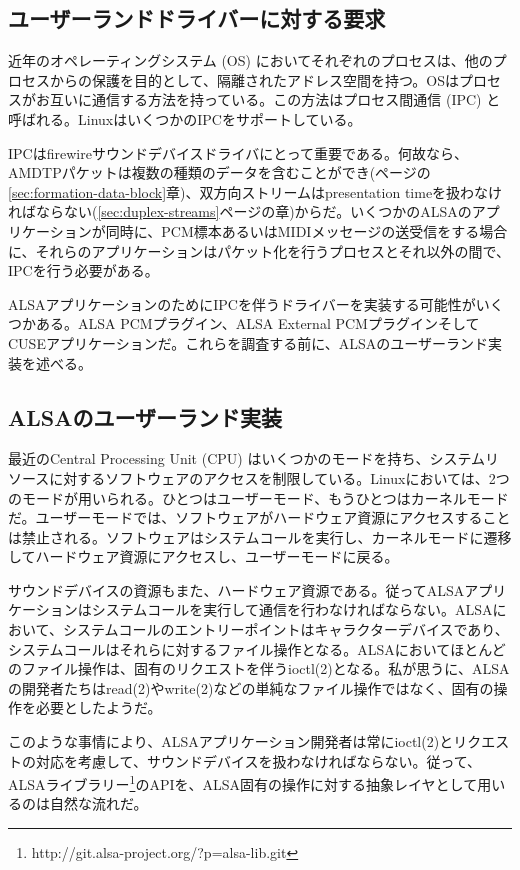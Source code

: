 \documentclass[onecolumn]{jarticle}
\begin{document}
\subsection{ユーザーランドドライバーに対する要求}

近年のオペレーティングシステム (OS) においてそれぞれのプロセスは、他のプロセスからの保護を目的として、隔離されたアドレス空間を持つ。OSはプロセスがお互いに通信する方法を持っている。この方法はプロセス間通信 (IPC) と呼ばれる。LinuxはいくつかのIPCをサポートしている。

IPCはfirewireサウンドデバイスドライバにとって重要である。何故なら、AMDTPパケットは複数の種類のデータを含むことができ(\pageref{sec:formation-data-block}ページの\ref{sec:formation-data-block}章)、双方向ストリームはpresentation timeを扱わなければならない(\ref{sec:duplex-streams}ページの\pageref{sec:duplex-streams}章)からだ。いくつかのALSAのアプリケーションが同時に、PCM標本あるいはMIDIメッセージの送受信をする場合に、それらのアプリケーションはパケット化を行うプロセスとそれ以外の間で、IPCを行う必要がある。

ALSAアプリケーションのためにIPCを伴うドライバーを実装する可能性がいくつかある。ALSA PCMプラグイン、ALSA External PCMプラグインそしてCUSEアプリケーションだ。これらを調査する前に、ALSAのユーザーランド実装を述べる。


\subsection{ALSAのユーザーランド実装}

最近のCentral Processing Unit (CPU) はいくつかのモードを持ち、システムリソースに対するソフトウェアのアクセスを制限している。Linuxにおいては、2つのモードが用いられる。ひとつはユーザーモード、もうひとつはカーネルモードだ。ユーザーモードでは、ソフトウェアがハードウェア資源にアクセスすることは禁止される。ソフトウェアはシステムコールを実行し、カーネルモードに遷移してハードウェア資源にアクセスし、ユーザーモードに戻る。

サウンドデバイスの資源もまた、ハードウェア資源である。従ってALSAアプリケーションはシステムコールを実行して通信を行わなければならない。ALSAにおいて、システムコールのエントリーポイントはキャラクターデバイスであり、システムコールはそれらに対するファイル操作となる。ALSAにおいてほとんどのファイル操作は、固有のリクエストを伴うioctl(2)となる。私が思うに、ALSAの開発者たちはread(2)やwrite(2)などの単純なファイル操作ではなく、固有の操作を必要としたようだ。

このような事情により、ALSAアプリケーション開発者は常にioctl(2)とリクエストの対応を考慮して、サウンドデバイスを扱わなければならない。従って、ALSAライブラリー\footnote{http://git.alsa-project.org/?p=alsa-lib.git}のAPIを、ALSA固有の操作に対する抽象レイヤとして用いるのは自然な流れだ。
\end{document}
